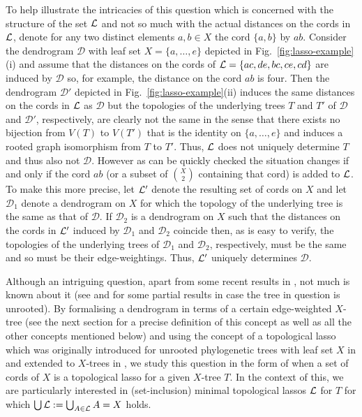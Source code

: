 To help illustrate the intricacies of this question which is concerned with
the structure of the set ${\mathcal L}$ and not so much with the actual distances on
the cords in ${\mathcal L}$, denote for any two distinct elements $a,b\in X$ the cord
$\{a,b\}$ by $ab$. Consider the dendrogram $\mathcal D$ with leaf set
$X=\{a,\ldots, e\}$ depicted in Fig.~\ref{fig:lasso-example}(i) and assume
that the distances on the cords of ${\mathcal L}=\{ac,de,bc,ce,cd\}$ are induced by
$\mathcal D$ so, for example, the distance on the cord $ab$
is four. Then the dendrogram $\mathcal D'$ depicted in
Fig.~\ref{fig:lasso-example}(ii) induces the same distances on the cords in
${\mathcal L}$ as $\mathcal D$ but the topologies of the underlying trees $T$ and $T'$
of $\mathcal D$ and $\mathcal D'$, respectively, are clearly not the same in
the sense that there exists no bijection from $V(T)$ to $V(T')$ that is the
identity on $\{a,\ldots, e\}$ and induces a rooted graph isomorphism from $T$
to $T'$.  Thus, ${\mathcal L}$ does not uniquely determine $T$ and thus also not
$\mathcal D$. However as can be quickly checked the situation changes if and
only if the cord $ab$ (or a subset of ${X\choose 2}$ containing that cord) is
added to ${\mathcal L}$.  To make this more precise, let ${\mathcal L}'$ denote the resulting
set of cords on $X$ and let $\mathcal D_1$ denote a dendrogram on $X$ for
which the topology of the underlying tree is the same as that of $\mathcal
D$. If $\mathcal D_2$ is a dendrogram on $X$ such that the distances on the
cords in ${\mathcal L}'$ induced by $\mathcal D_1$ and $\mathcal D_2$ coincide then, as
is easy to verify, the topologies of the underlying trees of $\mathcal D_1$
and $\mathcal D_2$, respectively, must be the same and so must be their
edge-weightings. Thus, ${\mathcal L}'$ uniquely determines $\mathcal D$.

Although an intriguing question, apart from some recent results in
\cite{HP13}, not much is known about it (see \cite{DHS11} and \cite{HS13} for
some partial results in case the tree in question is unrooted).  By
formalising a dendrogram in terms of a certain edge-weighted $X$-tree (see the
next section for a precise definition of this concept as well as all the other
concepts mentioned below) and using the concept of a topological lasso which
was originally introduced for unrooted phylogenetic trees with leaf set $X$ in
\cite{DHS11} and extended to $X$-trees in \cite {HP13}, we study this question
in the form of when a set of cords of $X$ is a topological lasso for a given
$X$-tree $T$. In the context of this, we are particularly interested in
(set-inclusion) minimal topological lassos ${\mathcal L}$ for $T$ for which $ \bigcup
{\mathcal L}:=\bigcup_{A\in{\mathcal L}} A=X$ holds.

